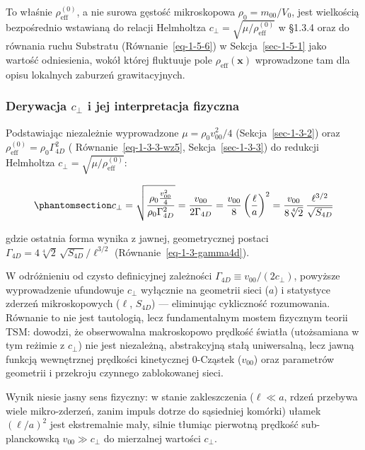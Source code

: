 \documentclass[
  polish,
  letterpaper,
  DIV=11,
  numbers=noendperiod,
  oneside]{scrartcl}
\begin{document}
To właśnie \(\rho_{\text{eff}}^{(0)}\), a nie surowa gęstość
mikroskopowa \(\rho_0=m_{00}/V_0\), jest wielkością bezpośrednio
wstawianą do relacji Helmholtza
\(c_\perp=\sqrt{\mu/\rho_{\text{eff}}^{(0)}}\) w §1.3.4 oraz do równania
ruchu Substratu (Równanie~\ref{eq-1-5-6}) w Sekcja~\ref{sec-1-5-1} jako
wartość odniesienia, wokół której fluktuuje pole
\(\rho_{\text{eff}}(\mathbf{x})\) wprowadzone tam dla opisu lokalnych
zaburzeń grawitacyjnych.

\subsubsection{\texorpdfstring{Derywacja \(c_{\perp}\) i jej
interpretacja
fizyczna}{Derywacja c\_\{\textbackslash perp\} i jej interpretacja fizyczna}}\label{sec-1-3-4}

Podstawiając niezależnie wyprowadzone \(\mu=\rho_0v_\text{00}^2/4\)
(Sekcja~\ref{sec-1-3-2}) oraz
\(\rho_{\text{eff}}^{(0)}=\rho_0\Gamma_{4D}^2\) (
Równanie~\ref{eq-1-3-3-wz5}, Sekcja~\ref{sec-1-3-3}) do redukcji
Helmholtza \(c_\perp=\sqrt{\mu/\rho_{\text{eff}}^{(0)}}\):

\begin{equation}\protect\phantomsection\label{eq-1-3-c-perp-final}{c_{\perp} = \sqrt{\frac{\rho_0\frac{v_\text{00}^2}{4}}{\rho_0\Gamma_{4D}^2}} = \frac{v_\text{00}}{2\Gamma_{4D}} = \frac{v_\text{00}}{8}\left(\frac{\ell}{a}\right)^2 = \frac{v_{00}}{8\sqrt[4]{2}}\,\frac{\ell^{3/2}}{\sqrt{S_{4D}}}}\end{equation}

gdzie ostatnia forma wynika z jawnej, geometrycznej postaci
\(\Gamma_{4D}=4\sqrt[4]{2}\,\sqrt{S_{4D}}/\ell^{3/2}\)
(Równanie~\ref{eq-1-3-gamma4d}).

W odróżnieniu od czysto definicyjnej zależności
\(\Gamma_{4D}\equiv v_\text{00}/(2c_\perp)\), powyższe wyprowadzenie
ufundowuje \(c_\perp\) wyłącznie na geometrii sieci (\(a\)) i statystyce
zderzeń mikroskopowych (\(\ell\), \(S_{4D}\)) --- eliminując cykliczność
rozumowania. Równanie to nie jest tautologią, lecz fundamentalnym mostem
fizycznym teorii TSM: dowodzi, że obserwowalna makroskopowo prędkość
światła (utożsamiana w tym reżimie z \(c_\perp\)) nie jest niezależną,
abstrakcyjną stałą uniwersalną, lecz jawną funkcją wewnętrznej prędkości
kinetycznej 0-Cząstek (\(v_{00}\)) oraz parametrów geometrii i przekroju
czynnego zablokowanej sieci.

Wynik niesie jasny sens fizyczny: w stanie zakleszczenia (\(\ell\ll a\),
rdzeń przebywa wiele mikro-zderzeń, zanim impuls dotrze do sąsiedniej
komórki) ułamek \((\ell/a)^2\) jest ekstremalnie mały, silnie tłumiąc
pierwotną prędkość sub-planckowską \(v_\text{00}\gg c_\perp\) do
mierzalnej wartości \(c_\perp\).
\end{document}
